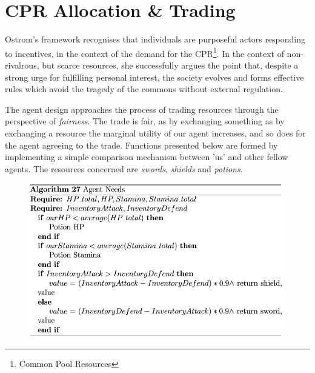 \section{CPR Allocation \& Trading}

Ostrom's framework recognises that individuals are purposeful actors responding to incentives, in the context of the demand for the CPR\footnote{Common Pool Resources}. In the context of non-rivalrous, but scarce resources, she successfully argues the point that, despite a strong urge for fulfilling personal interest, the society evolves and forms effective rules which avoid the tragedy of the commons without external regulation.

The agent design approaches the process of trading resources through the perspective of \textit{fairness}. The trade is fair, as by exchanging something as by exchanging a resource the marginal utility of our agent increases, and so does for the agent agreeing to the trade. Functions presented below are formed by implementing a simple comparison mechanism between 'us' and other fellow agents. The resources concerned are \textit{swords}, \textit{shields} and \textit{potions}.


\begin{figure}[htb]
    \centering
    \includegraphics[scale=0.7]{006_team_3_agent_design/FIGS/Algo27.png}
    \label{fig:algo27}
\end{figure}


